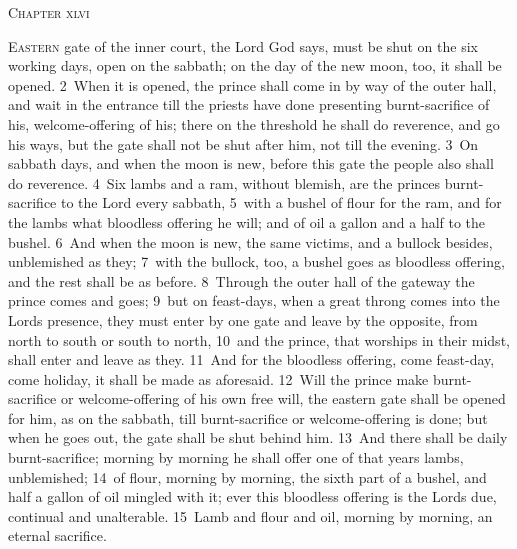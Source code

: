 \documentclass[10pt]{book} %
\begin{document}
\begin{large}\begin{center}\textsc{Chapter xlvi}\end{center}\end{large}
\lettrine[lines=2]{E}{astern} gate of the inner court, the Lord God says, must be shut on the six working days, open on the sabbath; on the day of the new moon, too, it shall be opened. \textcolor{benred8}{2}~When it is opened, the prince shall come in by way of the outer hall, and wait in the entrance till the priests have done presenting burnt-sacrifice of his, welcome-offering of his; there on the threshold he shall do reverence, and go his ways, but the gate shall not be shut after him, not till the evening. \textcolor{benred8}{3}~On sabbath days, and when the moon is new, before this gate the people also shall do reverence. \textcolor{benred8}{4}~Six lambs and a ram, without blemish, are the prince\textquotesingle s burnt-sacrifice to the Lord every sabbath, \textcolor{benred8}{5}~with a bushel of flour for the ram, and for the lambs what bloodless offering he will; and of oil a gallon and a half to the bushel. \textcolor{benred8}{6}~And when the moon is new, the same victims, and a bullock besides, unblemished as they; \textcolor{benred8}{7}~with the bullock, too, a bushel goes as bloodless offering, and the rest shall be as before. \textcolor{benred8}{8}~Through the outer hall of the gateway the prince comes and goes; \textcolor{benred8}{9}~but on feast-days, when a great throng comes into the Lord\textquotesingle s presence, they must enter by one gate and leave by the opposite, from north to south or south to north, \textcolor{benred8}{10}~and the prince, that worships in their midst, shall enter and leave as they. \textcolor{benred8}{11}~And for the bloodless offering, come feast-day, come holiday, it shall be made as aforesaid. \textcolor{benred8}{12}~Will the prince make burnt-sacrifice or welcome-offering of his own free will, the eastern gate shall be opened for him, as on the sabbath, till burnt-sacrifice or welcome-offering is done; but when he goes out, the gate shall be shut behind him. \textcolor{benred8}{13}~And there shall be daily burnt-sacrifice; morning by morning he shall offer one of that year\textquotesingle s lambs, unblemished; \textcolor{benred8}{14}~of flour, morning by morning, the sixth part of a bushel, and half a gallon of oil mingled with it; ever this bloodless offering is the Lord\textquotesingle s due, continual and unalterable. \textcolor{benred8}{15}~Lamb and flour and oil, morning by morning, an eternal sacrifice.
\end{document}
